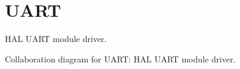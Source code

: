 \hypertarget{group__UART}{}\section{U\+A\+RT}
\label{group__UART}


H\+AL U\+A\+RT module driver.  


Collaboration diagram for U\+A\+RT\+:
H\+AL U\+A\+RT module driver. 

